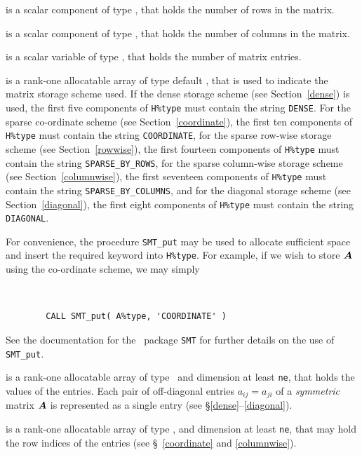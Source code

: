 \documentclass{galahad}
\begin{document}
\begin{description}

 is a scalar component of type \integer, 
that holds the number of rows in the matrix. 
 
 is a scalar component of type \integer, 
that holds the number of columns in the matrix. 
 
 is a scalar variable of type \integer, that
holds the number of matrix entries.

 is a rank-one allocatable array of type default \character, that
is used to indicate the matrix storage scheme used.  If the dense storage scheme 
(see Section~\ref{dense}) is used, 
the first five components of {\tt H\%type} must contain the
string {\tt DENSE}.
For the sparse co-ordinate scheme (see Section~\ref{coordinate}), 
the first ten components of {\tt H\%type} must contain the
string {\tt COORDINATE},  
for the sparse row-wise storage scheme (see Section~\ref{rowwise}),
the first fourteen components of {\tt H\%type} must contain the
string {\tt SPARSE\_BY\_ROWS},
for the sparse column-wise storage scheme (see Section~\ref{columnwise}),
the first seventeen components of {\tt H\%type} must contain the
string {\tt SPARSE\_BY\_COLUMNS},
and for the diagonal storage scheme (see Section~\ref{diagonal}),
the first eight components of {\tt H\%type} must contain the
string {\tt DIAGONAL}.

For convenience, the procedure {\tt SMT\_put} 
may be used to allocate sufficient space and insert the required keyword
into {\tt H\%type}.
For example, if we wish to store ${\bm{A}}$ using the co-ordinate scheme,
we may simply
{\tt 
\begin{verbatim}
        CALL SMT_put( A%type, 'COORDINATE' )
\end{verbatim}
}
\noindent
See the documentation for the \galahad\ package {\tt SMT} 
for further details on the use of {\tt SMT\_put}. 

 is a rank-one allocatable array of type \realdp\, 
and dimension at least {\tt ne}, that holds the values of the entries. 
Each pair of off-diagonal entries $a_{ij} = a_{ji}$ of a {\em symmetric}
matrix ${\bm{A}}$ is represented as a single entry 
(see \S\ref{dense}--\ref{diagonal}).

 is a rank-one allocatable array of type \integer, 
and dimension at least {\tt ne}, that may hold the row indices of the entries 
(see \S~\ref{coordinate} and \ref{columnwise}).


\end{description}
\end{document}
